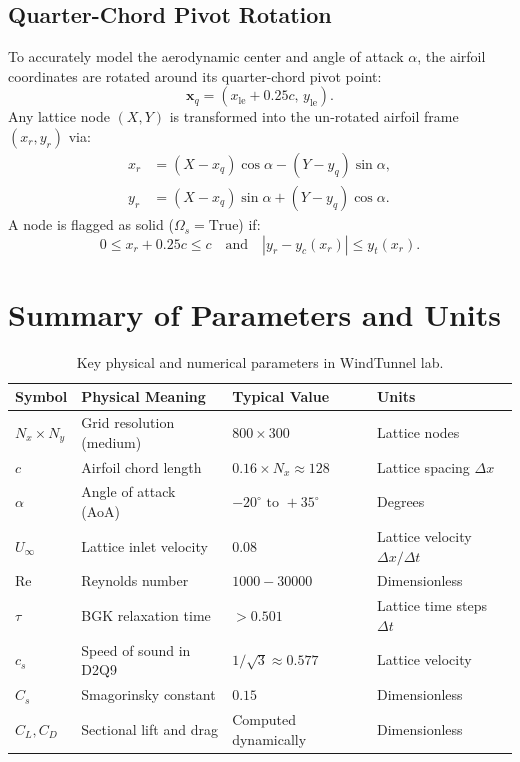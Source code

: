 \documentclass[11pt,a4paper]{article}
\begin{document}
\subsection{Quarter-Chord Pivot Rotation}
To accurately model the aerodynamic center and angle of attack $\alpha$, the airfoil coordinates are rotated around its quarter-chord pivot point:
\begin{equation}
\mathbf{x}_q = \left(x_{\text{le}} + 0.25c, \, y_{\text{le}}\right).
\end{equation}
Any lattice node $(X, Y)$ is transformed into the un-rotated airfoil frame $(x_r, y_r)$ via:
\begin{align}
x_r &= (X - x_q) \cos\alpha - (Y - y_q) \sin\alpha, \\
y_r &= (X - x_q) \sin\alpha + (Y - y_q) \cos\alpha.
\end{align}
A node is flagged as solid ($\Omega_s = \text{True}$) if:
\begin{equation}
0 \le x_r + 0.25c \le c \quad \text{and} \quad |y_r - y_c(x_r)| \le y_t(x_r).
\end{equation}

\section{Summary of Parameters and Units}

\begin{table}[htbp]
\centering
\caption{Key physical and numerical parameters in WindTunnel lab.}
\begin{tabular}{@{}llll@{}}
\toprule
\textbf{Symbol} & \textbf{Physical Meaning} & \textbf{Typical Value} & \textbf{Units} \\ \midrule
$N_x \times N_y$ & Grid resolution (medium) & $800 \times 300$ & Lattice nodes \\
$c$ & Airfoil chord length & $0.16 \times N_x \approx 128$ & Lattice spacing $\Delta x$ \\
$\alpha$ & Angle of attack (AoA) & $-20^\circ \text{ to } +35^\circ$ & Degrees \\
$U_\infty$ & Lattice inlet velocity & $0.08$ & Lattice velocity $\Delta x / \Delta t$ \\
$\mathrm{Re}$ & Reynolds number & $1000 - 30000$ & Dimensionless \\
$\tau$ & BGK relaxation time & $> 0.501$ & Lattice time steps $\Delta t$ \\
$c_s$ & Speed of sound in D2Q9 & $1/\sqrt{3} \approx 0.577$ & Lattice velocity \\
$C_s$ & Smagorinsky constant & $0.15$ & Dimensionless \\
$C_L, C_D$ & Sectional lift and drag & Computed dynamically & Dimensionless \\
\bottomrule
\end{tabular}
\end{table}
\end{document}
